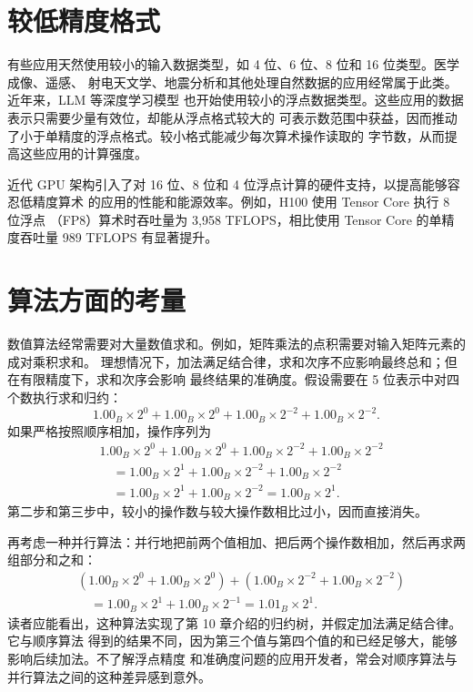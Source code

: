 \section{较低精度格式}
\label{sec:appa-lower-precision}

有些应用天然使用较小的输入数据类型，如 4 位、6 位、8 位和 16 位类型。医学成像、遥感、
射电天文学、地震分析和其他处理自然数据的应用经常属于此类。近年来，LLM 等深度学习模型
也开始使用较小的浮点数据类型。这些应用的数据表示只需要少量有效位，却能从浮点格式较大的
可表示数范围中获益，因而推动了小于单精度的浮点格式。较小格式能减少每次算术操作读取的
字节数，从而提高这些应用的计算强度。

近代 GPU 架构引入了对 16 位、8 位和 4 位浮点计算的硬件支持，以提高能够容忍低精度算术
的应用的性能和能源效率\cite{appa-ocp-mx}。例如，H100 使用 Tensor Core 执行 8 位浮点
（FP8）算术时吞吐量为 3,958 TFLOPS，相比使用 Tensor Core 的单精度吞吐量
989 TFLOPS 有显著提升。

\section{算法方面的考量}
\label{sec:appa-algorithm-considerations}

数值算法经常需要对大量数值求和。例如，矩阵乘法的点积需要对输入矩阵元素的成对乘积求和。
理想情况下，加法满足结合律，求和次序不应影响最终总和；但在有限精度下，求和次序会影响
最终结果的准确度。假设需要在 5 位表示中对四个数执行求和归约：
\[
  1.00_B\times2^0+1.00_B\times2^0+1.00_B\times2^{-2}+1.00_B\times2^{-2}.
\]
如果严格按照顺序相加，操作序列为
\begin{align*}
  &1.00_B\times2^0+1.00_B\times2^0+1.00_B\times2^{-2}+1.00_B\times2^{-2}\\
  &\quad=1.00_B\times2^1+1.00_B\times2^{-2}+1.00_B\times2^{-2}\\
  &\quad=1.00_B\times2^1+1.00_B\times2^{-2}
   =1.00_B\times2^1.
\end{align*}
第二步和第三步中，较小的操作数与较大操作数相比过小，因而直接消失。

再考虑一种并行算法：并行地把前两个值相加、把后两个操作数相加，然后再求两组部分和之和：
\begin{align*}
  &(1.00_B\times2^0+1.00_B\times2^0)
    +(1.00_B\times2^{-2}+1.00_B\times2^{-2})\\
  &\quad=1.00_B\times2^1+1.00_B\times2^{-1}
   =1.01_B\times2^1.
\end{align*}
读者应能看出，这种算法实现了第 10 章介绍的归约树，并假定加法满足结合律。它与顺序算法
得到的结果不同，因为第三个值与第四个值的和已经足够大，能够影响后续加法。不了解浮点精度
和准确度问题的应用开发者，常会对顺序算法与并行算法之间的这种差异感到意外。

